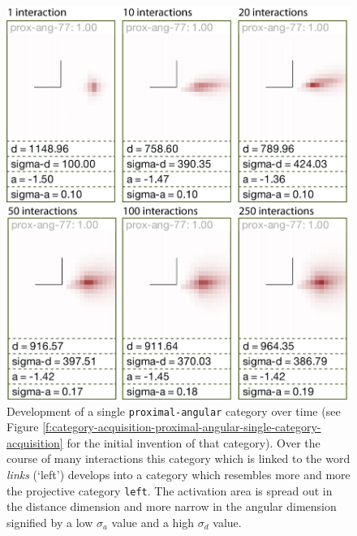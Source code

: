 \begin{figure}
\begin{center}
\includegraphics[width=0.9\columnwidth]{figs/category-acquisition-proximal-angular-category-development-over-time.png}
\end{center}
\caption[Development of a single {\footnotesize\tt proximal-angular} category over time]{%
Development of a single {\footnotesize\tt proximal-angular} category over time (see Figure \ref{f:category-acquisition-proximal-angular-single-category-acquisition} for the initial invention of that category). 
Over the course of many interactions this category which is linked to the word \textit{links} (`left') develops
into a category which resembles more and more the projective category {\footnotesize\tt left}. 
The activation area is spread out in the distance dimension and more narrow in the angular 
dimension signified by a low $\sigma_a$ value and a high $\sigma_d$ value.}
\label{f:category-acquisition-proximal-angular-category-development-over-time}
\end{figure}

